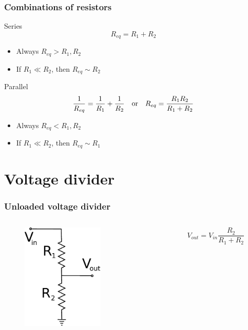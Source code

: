 \documentclass[beamer]{standalone}
\begin{document}
\begin{frame}
 \frametitle{Combinations of resistors}
 \begin{block}{Series}
  \begin{equation*}
   R_{eq} = R_1 + R_2
  \end{equation*}
  \begin{itemize}
   \item Always $R_{eq} > R_1, R_2$
   \item If $R_1 \ll R_2$, then $R_{eq} \sim R_2$
  \end{itemize}
 \end{block}
 \begin{block}{Parallel}
  \begin{equation*}
   \frac{1}{R_{eq}} = \frac{1}{R_1} + \frac{1}{R_2} \quad \hbox{or} \quad R_{eq} = \frac{R_1 R_2}{R_1 + R_2}
  \end{equation*}
  \begin{itemize}
   \item Always $R_{eq} < R_1, R_2$
   \item If $R_1 \ll R_2$, then $R_{eq} \sim R_1$
  \end{itemize}
 \end{block}
\end{frame}


\section{Voltage divider}
\begin{frame}
 \frametitle{Unloaded voltage divider}
 \begin{columns}[c]
  \begin{column}{.3\textwidth}
   \begin{figure}
    \includegraphics[height=2in]{./pics/unloaded_voltage_divider}
   \end{figure}
  \end{column}
  \begin{column}{.7\textwidth}
   \[ V_{out} = V_{in} \frac{R_2}{R_1+R_2} \]
  \end{column}
 \end{columns}
\end{frame}
\end{document}
